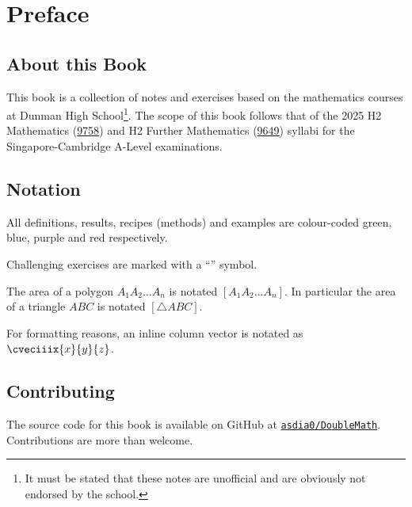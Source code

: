 \chapter*{Preface}

\section*{About this Book}

This book is a collection of notes and exercises based on the mathematics courses at Dunman High School\footnote{It must be stated that these notes are unofficial and are obviously not endorsed by the school.}. The scope of this book follows that of the 2025 H2 Mathematics (\href{https://www.seab.gov.sg/files/A%20Level%20Syllabus%20Sch%20Cddts/2025/8865_y25_sy.pdf}{9758}) and H2 Further Mathematics (\href{https://www.seab.gov.sg/files/A%20Level%20Syllabus%20Sch%20Cddts/2025/9649_y25_sy.pdf}{9649}) syllabi for the Singapore-Cambridge A-Level examinations.

\section*{Notation}

All definitions, results, recipes (methods) and examples are colour-coded green, blue, purple and red respectively. 

Challenging exercises are marked with a ``\chili'' symbol.

The area of a polygon $A_1 A_2 \dots A_n$ is notated $[A_1 A_2 \dots A_n]$. In particular the area of a triangle $ABC$ is notated $[\triangle ABC]$.

For formatting reasons, an inline column vector is notated as $\cveciiix{x}{y}{z}$.

\section*{Contributing}

The source code for this book is available on GitHub at \href{https://github.com/asdia0/DoubleMath}{\texttt{asdia0/DoubleMath}}. Contributions are more than welcome.